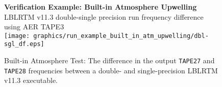 \begin{figure}[htp]
  \centering
  \qquad\sffamily\textbf{Verification Example: Built-in Atmosphere Upwelling}\\
  \qquad\textsf{LBLRTM v11.3 double-single precision run frequency difference using AER TAPE3}\\
  \texttt{[image: graphics/run\_example\_built\_in\_atm\_upwelling/dbl-sgl\_df.eps]}
  \caption{Built-in Atmosphere Test: The difference in the output \texttt{TAPE27} and \texttt{TAPE28} frequencies between a double- and single-precision LBLRTM v11.3 executable.}
  \label{fig:run_example_built_in_atm_upwelling-dbl-sgl_df}
\end{figure}

